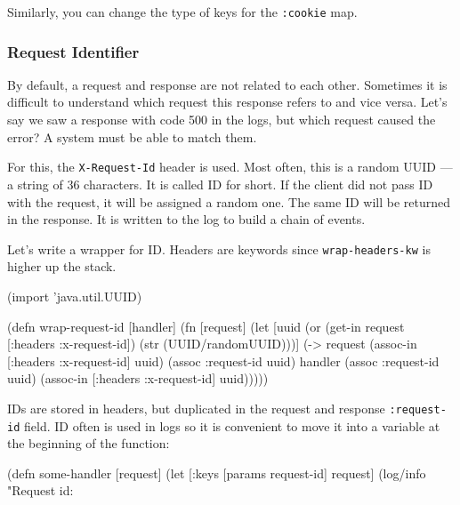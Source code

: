 Similarly, you can change the type of keys for the \verb|:cookie| map.

\subsubsection*{Request Identifier}


By default, a request and response are not related to each other. Sometimes it is difficult to understand which request this response refers to and vice versa. Let's say we saw a response with code 500 in the logs, but which request caused the error? A system must be able to match them.

For this, the \verb|X-Request-Id| header is used. Most often, this is a random UUID — a string of 36 characters. It is called ID for short. If the client did not pass ID with the request, it will be assigned a random one. The same ID will be returned in the response. It is written to the log to build a chain of events.


Let's write a wrapper for ID. Headers are keywords since \verb|wrap-headers-kw| is higher up the stack.

\begin{english}
\begin{clojure}
(import 'java.util.UUID)

(defn wrap-request-id [handler]
(fn [request]
(let [uuid (or (get-in request [:headers :x-request-id])
(str (UUID/randomUUID)))]
(-> request
(assoc-in [:headers :x-request-id] uuid)
(assoc :request-id uuid)
handler
(assoc :request-id uuid)
(assoc-in [:headers :x-request-id] uuid)))))
\end{clojure}
\end{english}


IDs are stored in headers, but duplicated in the request and response \verb|:request-id| field. ID often is used in logs so it is convenient to move it into a variable at the beginning of the function:


\begin{english}
\begin{clojure}
(defn some-handler [request]
(let [{:keys [params request-id]} request]
(log/info "Request id: %
\end{clojure}
\end{english}

